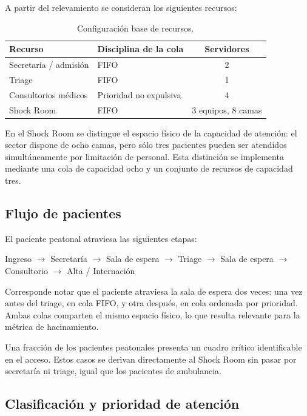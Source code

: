 A partir del relevamiento se consideran los siguientes recursos:

\begin{table}[H]
\centering
\begin{tabular}{llc}
\toprule
\textbf{Recurso} & \textbf{Disciplina de la cola} & \textbf{Servidores} \\
\midrule
Secretaría / admisión   & FIFO                    & 2 \\
Triage                  & FIFO                    & 1 \\
Consultorios médicos    & Prioridad no expulsiva  & 4 \\
Shock Room              & FIFO                    & 3 equipos, 8 camas \\
\bottomrule
\end{tabular}
\caption{Configuración base de recursos.}
\label{tab:recursos}
\end{table}

En el Shock Room se distingue el espacio físico de la capacidad de atención:
el sector dispone de ocho camas, pero sólo tres pacientes pueden ser
atendidos simultáneamente por limitación de personal. Esta distinción se
implementa mediante una cola de capacidad ocho y un conjunto de recursos de
capacidad tres.

\subsection{Flujo de pacientes}

El paciente peatonal atraviesa las siguientes etapas:

\begin{center}
Ingreso $\rightarrow$ Secretaría $\rightarrow$ Sala de espera $\rightarrow$
Triage $\rightarrow$ Sala de espera $\rightarrow$ Consultorio $\rightarrow$
Alta / Internación
\end{center}

Corresponde notar que el paciente atraviesa la sala de espera dos veces: una
vez antes del triage, en cola FIFO, y otra después, en cola ordenada por
prioridad. Ambas colas comparten el mismo espacio físico, lo que resulta
relevante para la métrica de hacinamiento.

Una fracción de los pacientes peatonales presenta un cuadro crítico
identificable en el acceso. Estos casos se derivan directamente al Shock Room
sin pasar por secretaría ni triage, igual que los pacientes de ambulancia.

\subsection{Clasificación y prioridad de atención}

